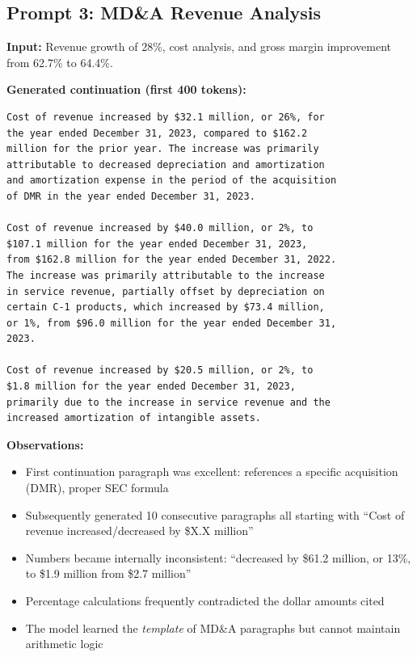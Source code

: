 \documentclass[12pt]{article}
\begin{document}
\subsection{Prompt 3: MD\&A Revenue Analysis}

\textbf{Input:} Revenue growth of 28\%, cost analysis, and gross margin improvement from 62.7\% to 64.4\%.

\textbf{Generated continuation (first 400 tokens):}

\begin{Verbatim}[fontsize=\small]
Cost of revenue increased by $32.1 million, or 26%, for
the year ended December 31, 2023, compared to $162.2
million for the prior year. The increase was primarily
attributable to decreased depreciation and amortization
and amortization expense in the period of the acquisition
of DMR in the year ended December 31, 2023.

Cost of revenue increased by $40.0 million, or 2%, to
$107.1 million for the year ended December 31, 2023,
from $162.8 million for the year ended December 31, 2022.
The increase was primarily attributable to the increase
in service revenue, partially offset by depreciation on
certain C-1 products, which increased by $73.4 million,
or 1%, from $96.0 million for the year ended December 31,
2023.

Cost of revenue increased by $20.5 million, or 2%, to
$1.8 million for the year ended December 31, 2023,
primarily due to the increase in service revenue and the
increased amortization of intangible assets.
\end{Verbatim}

\textbf{Observations:}
\begin{itemize}
    \item First continuation paragraph was excellent: references a specific acquisition (DMR), proper SEC formula
    \item Subsequently generated 10 consecutive paragraphs all starting with ``Cost of revenue increased/decreased by \$X.X million''
    \item Numbers became internally inconsistent: ``decreased by \$61.2 million, or 13\%, to \$1.9 million from \$2.7 million''
    \item Percentage calculations frequently contradicted the dollar amounts cited
    \item The model learned the \textit{template} of MD\&A paragraphs but cannot maintain arithmetic logic
\end{itemize}
\end{document}
